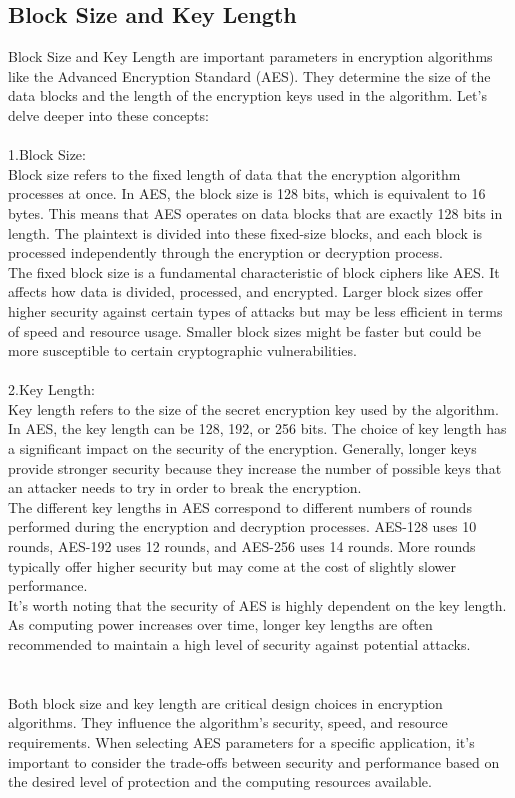 \documentclass{report}
\begin{document}
\subsection{Block Size and Key Length}
Block Size and Key Length are important parameters in encryption algorithms like the Advanced Encryption Standard (AES). They determine the size of the data blocks and the length of the encryption keys used in the algorithm. Let's delve deeper into these concepts:\\
\\
1.Block Size:\\
Block size refers to the fixed length of data that the encryption algorithm processes at once. In AES, the block size is 128 bits, which is equivalent to 16 bytes. This means that AES operates on data blocks that are exactly 128 bits in length. The plaintext is divided into these fixed-size blocks, and each block is processed independently through the encryption or decryption process.\\
The fixed block size is a fundamental characteristic of block ciphers like AES. It affects how data is divided, processed, and encrypted. Larger block sizes offer higher security against certain types of attacks but may be less efficient in terms of speed and resource usage. Smaller block sizes might be faster but could be more susceptible to certain cryptographic vulnerabilities.\\
\\
2.Key Length:\\
Key length refers to the size of the secret encryption key used by the algorithm. In AES, the key length can be 128, 192, or 256 bits. The choice of key length has a significant impact on the security of the encryption. Generally, longer keys provide stronger security because they increase the number of possible keys that an attacker needs to try in order to break the encryption.\\
The different key lengths in AES correspond to different numbers of rounds performed during the encryption and decryption processes. AES-128 uses 10 rounds, AES-192 uses 12 rounds, and AES-256 uses 14 rounds. More rounds typically offer higher security but may come at the cost of slightly slower performance.\\
It's worth noting that the security of AES is highly dependent on the key length. As computing power increases over time, longer key lengths are often recommended to maintain a high level of security against potential attacks.\\
\\
\\
Both block size and key length are critical design choices in encryption algorithms. They influence the algorithm's security, speed, and resource requirements. When selecting AES parameters for a specific application, it's important to consider the trade-offs between security and performance based on the desired level of protection and the computing resources available.
\end{document}
